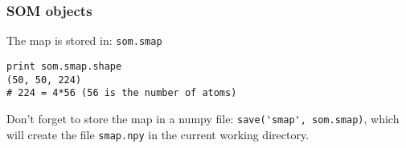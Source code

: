 \begin{frame}[fragile]
    \frametitle{SOM objects}
    The map is stored in: \lstinline{som.smap}
    \begin{lstlisting}
print som.smap.shape
(50, 50, 224)
# 224 = 4*56 (56 is the number of atoms)
    \end{lstlisting}
    Don't forget to store the map in a numpy file: \lstinline{save('smap', som.smap)}, which will create the file \texttt{smap.npy} in the current working directory.
\end{frame}
